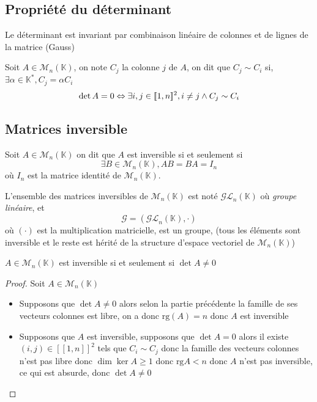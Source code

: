 \documentclass[11pt,colorlinks]{book}
\theoremstyle{mytheoremstyle}
\theoremstyle{mytheoremstyle}
\theoremstyle{mytheoremstyle}
\theoremstyle{mytheoremstyle}
\theoremstyle{mytheoremstyle}
\theoremstyle{mytheoremstyle}
\theoremstyle{mytheoremstyle}
\theoremstyle{mytheoremstyle}
\theoremstyle{myproblemstyle}
\def\mbb#1{\mathbb{#1}}
\def\bK{\mbb{K}}
\renewcommand{\equiv}{\sim}
\begin{document}
\subsection{Propriété du déterminant}
\begin{theorem}
  Le déterminant est invariant par combinaison linéaire de colonnes et de lignes de la matrice (Gauss)
\end{theorem}
\begin{prop}
  Soit $A \in \mathcal{M}_n(\bK)$, on note $C_j$ la colonne $j$ de $A$, on dit que $C_j \equiv C_i$ si, $\exists \alpha \in \bK^{*}, C_j = \alpha C_i$
  \begin{equation*}
    \det A = 0 \Leftrightarrow \exists i,j \in [\![1,n]\!]^2, i \not= j \wedge C_j \equiv C_i \\ 
  \end{equation*}
\end{prop}
\subsection{Matrices inversible}
\begin{definition}
  Soit $A \in \mathcal{M}_n(\bK)$ on dit que $A$ est inversible si et seulement si 
  \begin{equation*}
    \exists B \in \mathcal{M}_n(\bK), AB = BA = I_n
  \end{equation*}
  où $I_n$ est la matrice identité de $\mathcal{M}_n(\bK)$.\newline

  L'ensemble des matrices inversibles de $\mathcal{M}_n(\bK)$ est noté $\mathcal{GL}_n(\bK)$ où \textit{groupe linéaire}, et 
  \begin{equation*}
    \mathcal G = (\mathcal{GL}_n(\bK),\cdot)
  \end{equation*}
  où $(\cdot)$ est la multiplication matricielle, est un groupe, (tous les éléments sont inversible et le reste est hérité de la structure d'espace vectoriel de $\mathcal{M}_n(\bK)$)
\end{definition}
\begin{prop}
  $A \in \mathcal{M}_n(\bK)$ est inversible si et seulement si $\det A \not= 0$
  \begin{proof}
    Soit $A \in \mathcal{M}_n(\bK)$
    \begin{itemize}
      \item Supposons que $\det A \not= 0$ alors selon la partie précédente la famille de ses vecteurs colonnes est libre, on a donc $\text{rg}(A) = n$ donc $A$ est inversible
      \item Supposons que $A$ est inversible, supposons que $\det A = 0$ alors il existe $(i,j) \in [\![1,n]\!]^2$ tels que $C_i \equiv C_j$ donc la famille 
      des vecteurs colonnes n'est pas libre donc $\dim \ker A \geq 1$ donc $\text{rg} A < n$ donc $A$ n'est pas inversible, ce qui est absurde, donc $\det A \not= 0$   
    \end{itemize}
  \end{proof}
\end{prop}
\end{document}
